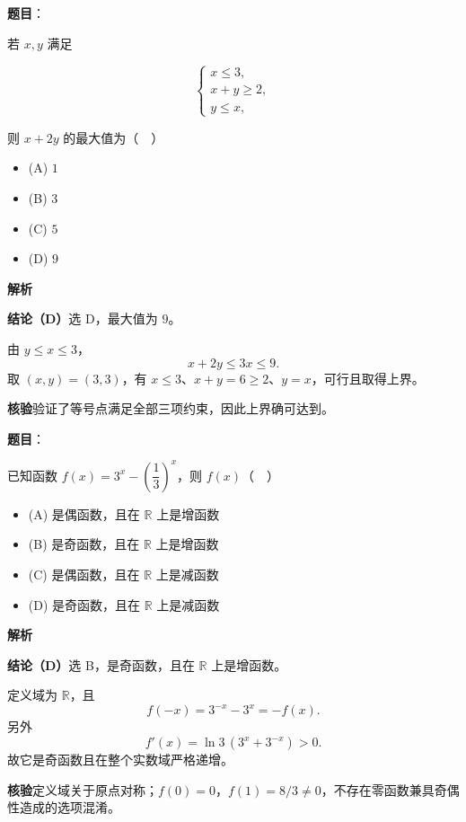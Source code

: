 \begin{answer}

\textbf{题目}：

若 $x,y$ 满足

\nopagebreak[4]
\[
\begin{cases}
x\leqslant3,\\
x+y\geqslant2,\\
y\leqslant x,
\end{cases}
\]

则 $x+2y$ 的最大值为（　）

\begin{itemize}
\item (A) $1$
\item (B) $3$
\item (C) $5$
\item (D) $9$
\end{itemize}

\textbf{解析}

\textbf{结论（D）}选 D，最大值为 $9$。

由 $y\leqslant x\leqslant3$，
\nopagebreak[4]
\[
x+2y\leqslant3x\leqslant9.
\]
取 $(x,y)=(3,3)$，有 $x\leqslant3$、$x+y=6\geqslant2$、$y=x$，可行且取得上界。

\textbf{核验}验证了等号点满足全部三项约束，因此上界确可达到。


\end{answer}
\begin{answer}

\textbf{题目}：

已知函数 $f(x)=3^x-\left(\dfrac13\right)^x$，则 $f(x)$（　）

\begin{itemize}
\item (A) 是偶函数，且在 $\mathbb R$ 上是增函数
\item (B) 是奇函数，且在 $\mathbb R$ 上是增函数
\item (C) 是偶函数，且在 $\mathbb R$ 上是减函数
\item (D) 是奇函数，且在 $\mathbb R$ 上是减函数
\end{itemize}

\textbf{解析}

\textbf{结论（D）}选 B，是奇函数，且在 $\mathbb R$ 上是增函数。

定义域为 $\mathbb R$，且
\nopagebreak[4]
\[
f(-x)=3^{-x}-3^x=-f(x).
\]
另外
\nopagebreak[4]
\[
f'(x)=\ln3\,(3^x+3^{-x})>0.
\]
故它是奇函数且在整个实数域严格递增。

\textbf{核验}定义域关于原点对称；$f(0)=0$，$f(1)=8/3\ne0$，不存在零函数兼具奇偶性造成的选项混淆。


\end{answer}
